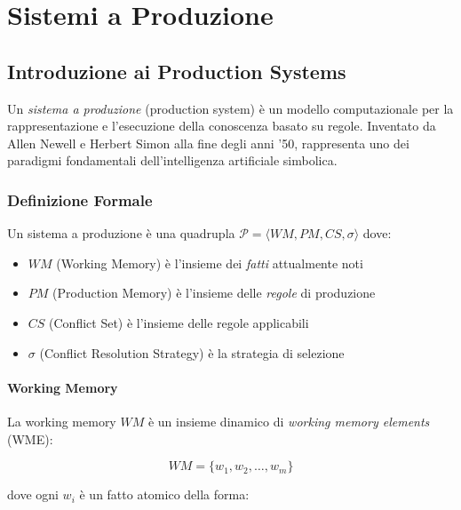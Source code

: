 
\chapter{Sistemi a Produzione}
\label{cap:sistemi_produzione}

\section{Introduzione ai Production Systems}

Un \textit{sistema a produzione} (production system) è un modello computazionale per la rappresentazione e l'esecuzione della conoscenza basato su regole. Inventato da Allen Newell e Herbert Simon alla fine degli anni '50, rappresenta uno dei paradigmi fondamentali dell'intelligenza artificiale simbolica.

\subsection{Definizione Formale}

\begin{definizione}
Un sistema a produzione è una quadrupla $\mathcal{P} = \langle WM, PM, CS, \sigma \rangle$ dove:
\begin{itemize}
\item $WM$ (Working Memory) è l'insieme dei \textit{fatti} attualmente noti
\item $PM$ (Production Memory) è l'insieme delle \textit{regole} di produzione
\item $CS$ (Conflict Set) è l'insieme delle regole applicabili
\item $\sigma$ (Conflict Resolution Strategy) è la strategia di selezione
\end{itemize}
\end{definizione}

\subsubsection{Working Memory}

La working memory $WM$ è un insieme dinamico di \textit{working memory elements} (WME):

\begin{equation}
WM = \{w_1, w_2, \ldots, w_m\}
\end{equation}

dove ogni $w_i$ è un fatto atomico della forma:

